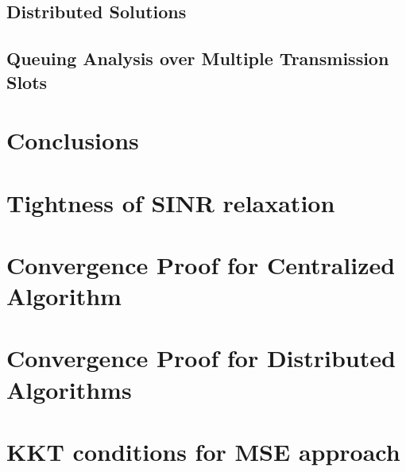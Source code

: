 \documentclass[10pt,journal,twocolumn,letterpaper]{./../Styles/IEEEtran}
\begin{document}
\subsection{Distributed Solutions} \label{sec-5.2}


\subsection{Queuing Analysis over Multiple Transmission Slots} \label{time-correlated}
\review{}

\section{Conclusions} \label{sec-6}





\clearpage


\appendices

%

\section{Tightness of \ac{SINR} relaxation} \label{a-3}
\review{}

\section{Convergence Proof for Centralized Algorithm} \label{sec-3.5}
\review{}

\section{Convergence Proof for Distributed Algorithms} \label{sec-dist-conv}
\review{}

\section{\ac{KKT} conditions for \ac{MSE} approach} \label{a-1}

\end{document}
